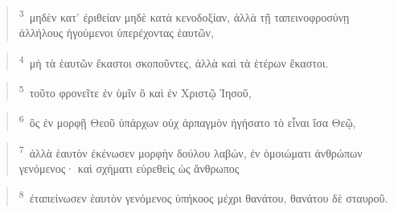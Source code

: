 \documentclass{article}
\newcommand{\currentverse}{1} %
\newcommand{\setcurrentverse}[1]{\renewcommand{\currentverse}{#1}}
\begin{document}
\begin{verse}

\setcurrentverse{3}

\setcounter{footnote}{0}

\textsuperscript{3}~μηδὲν κατ’ ἐριθείαν μηδὲ κατὰ κενοδοξίαν, ἀλλὰ τῇ ταπεινοφροσύνῃ ἀλλήλους ἡγούμενοι ὑπερέχοντας ἑαυτῶν,

\end{verse}

\begin{verse}

\setcurrentverse{4}

\setcounter{footnote}{0}

\textsuperscript{4}~μὴ τὰ ἑαυτῶν ἕκαστοι σκοποῦντες, ἀλλὰ καὶ τὰ ἑτέρων ἕκαστοι.

\end{verse}

\begin{verse}

\setcurrentverse{5}

\setcounter{footnote}{0}

\textsuperscript{5}~τοῦτο φρονεῖτε ἐν ὑμῖν ὃ καὶ ἐν Χριστῷ Ἰησοῦ,

\end{verse}

\begin{verse}

\setcurrentverse{6}

\setcounter{footnote}{0}

\textsuperscript{6}~ὃς ἐν μορφῇ Θεοῦ ὑπάρχων οὐχ ἁρπαγμὸν ἡγήσατο τὸ εἶναι ἴσα Θεῷ,

\end{verse}

\begin{verse}

\setcurrentverse{7}

\setcounter{footnote}{0}

\textsuperscript{7}~ἀλλὰ ἑαυτὸν ἐκένωσεν μορφὴν δούλου λαβών, ἐν ὁμοιώματι ἀνθρώπων γενόμενος· καὶ σχήματι εὑρεθεὶς ὡς ἄνθρωπος

\end{verse}

\begin{verse}

\setcurrentverse{8}

\setcounter{footnote}{0}

\textsuperscript{8}~ἐταπείνωσεν ἑαυτὸν γενόμενος ὑπήκοος μέχρι θανάτου, θανάτου δὲ σταυροῦ.

\end{verse}
\end{document}
